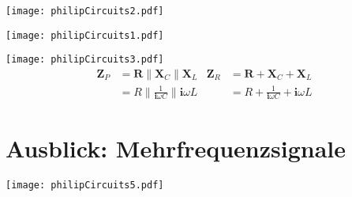 \begin{frame}
    \begin{center}\texttt{[image: philipCircuits2.pdf]}\end{center}
\end{frame}

\begin{frame}
    \begin{center}\texttt{[image: philipCircuits1.pdf]}\end{center}
\end{frame}

\begin{frame}
    \texttt{[image: philipCircuits3.pdf]}
    \begin{align*}
    \mathbf{Z}_P &= \mathbf{R} \parallel \mathbf{X}_C \parallel \mathbf{X}_L & 
    \mathbf{Z}_R &= \mathbf{R} + \mathbf{X}_C + \mathbf{X}_L \\
    &= R \parallel \frac{1}{\mathbf{i}\omega C} \parallel \mathbf{i}\omega L &
    &= R + \frac{1}{\mathbf{i}\omega C} + \mathbf{i}\omega L
    \end{align*}
\end{frame}


\section{Ausblick: Mehrfrequenzsignale}

\begin{frame}
    \begin{center}
        \texttt{[image: philipCircuits5.pdf]}
    \end{center}
\end{frame}

